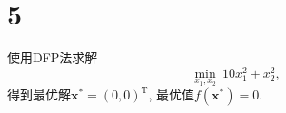 \section*{5}

使用DFP法求解
\begin{equation}
    \min_{x_1,x_2} ~ 10x_1^2+x_2^2,
    \label{equation:5}
\end{equation}
得到最优解$\bm{x}^*=(0,0)^\mathrm{T}$, 最优值$f(\bm{x}^*)=0$.
